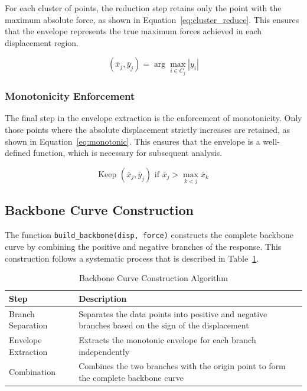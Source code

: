 \documentclass[11pt,a4paper]{article}
\begin{document}
For each cluster of points, the reduction step retains only the point with the maximum absolute force, as shown in Equation~\ref{eq:cluster_reduce}. This ensures that the envelope represents the true maximum forces achieved in each displacement region.

\begin{equation}
(\bar{x}_j, \bar{y}_j) = \arg\max_{i \in C_j} |y_i|
\label{eq:cluster_reduce}
\end{equation}

\subsubsection{Monotonicity Enforcement}

The final step in the envelope extraction is the enforcement of monotonicity. Only those points where the absolute displacement strictly increases are retained, as shown in Equation~\ref{eq:monotonic}. This ensures that the envelope is a well-defined function, which is necessary for subsequent analysis.

\begin{equation}
\text{Keep } (\bar{x}_j, \bar{y}_j) \text{ if } \bar{x}_j > \max_{k < j} \bar{x}_k
\label{eq:monotonic}
\end{equation}

\subsection{Backbone Curve Construction}

The function \texttt{build\_backbone(disp, force)} constructs the complete backbone curve by combining the positive and negative branches of the response. This construction follows a systematic process that is described in Table~\ref{tab:backbone_algorithm}.

\begin{table}[h]
\centering
\caption{Backbone Curve Construction Algorithm}\label{tab:backbone_algorithm}
\begin{tabular}{p{4cm}p{10cm}}
\toprule
\textbf{Step} & \textbf{Description} \\
\midrule
Branch Separation & Separates the data points into positive and negative branches based on the sign of the displacement \\
Envelope Extraction & Extracts the monotonic envelope for each branch independently \\
Combination & Combines the two branches with the origin point to form the complete backbone curve \\
\bottomrule
\end{tabular}
\end{table}
\end{document}
